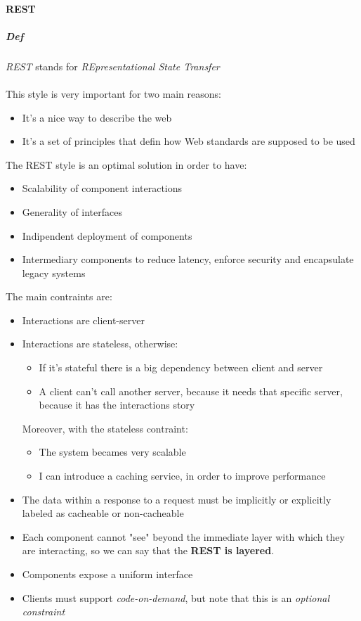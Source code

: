\documentclass{article}
\begin{document}
    \paragraph{REST}
    \subparagraph{Def}
    \textit{REST} stands for \textit{REpresentational State Transfer}\\
    \\
    This style is very important for two main reasons:
    \begin{itemize}
        \item It's a nice way to describe the web
        \item It's a set of principles that defin how Web standards
                are supposed to be used
    \end{itemize}
    The REST style is an optimal solution in order to have:
    \begin{itemize}
        \item Scalability of component interactions
        \item Generality of interfaces
        \item Indipendent deployment of components
        \item Intermediary components to reduce latency, enforce
            security and encapsulate legacy systems
    \end{itemize}
    The main contraints are:
    \begin{itemize}
        \item Interactions are client-server
        \item Interactions are stateless, otherwise:
        \begin{itemize}
                \item If it's stateful there is a big dependency between client
                        and server
                \item A client can't call another server, because it needs that
                        specific server, because it has the interactions story 
        \end{itemize}
            Moreover, with the stateless contraint:
        \begin{itemize}
            \item The system becames very scalable
            \item I can introduce a caching service, in order to improve performance
        \end{itemize} 
        \item The data within a response to a request must be implicitly or explicitly
            labeled as cacheable or non-cacheable
        \item Each component cannot "see" beyond the immediate layer with which they
            are interacting, so we can say that the \textbf{REST is layered}.
        \item Components expose a uniform interface
        \item Clients must support \textit{code-on-demand}, but note that this is an 
            \textsl{optional constraint}
    \end{itemize}
    
\end{document}
